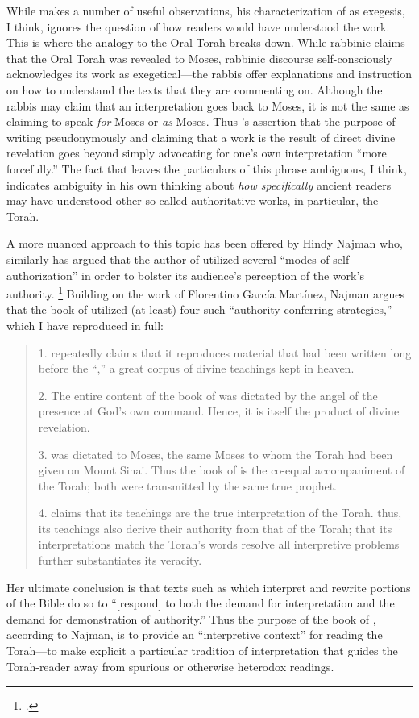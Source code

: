 While \vanderkam makes a number of useful observations, his characterization of \jub as exegesis, I think, ignores the question of how readers would have understood the work. This is where the analogy to the Oral Torah breaks down. While rabbinic claims that the Oral Torah was revealed to Moses, rabbinic discourse self-consciously acknowledges its work as exegetical---the rabbis offer explanations and instruction on how to understand the texts that they are commenting on. Although the rabbis may claim that an interpretation goes back to Moses, it is not the same as claiming to speak \emph{for} Moses or \emph{as} Moses. Thus \vanderkam's assertion that the purpose of writing pseudonymously and claiming that a work is the result of direct divine revelation goes beyond simply advocating for one's own interpretation ``more forcefully.'' The fact that \vanderkam leaves the particulars of this phrase ambiguous, I think, indicates ambiguity in his own thinking about \emph{how specifically} ancient readers may have understood \jub \visavis other so-called authoritative works, in particular, the Torah.

A more nuanced approach to this topic has been offered by Hindy Najman who, similarly has argued that the author of \jub utilized several ``modes of self-authorization'' in order to bolster its audience's perception of the work's authority.%
    \footnote{\cite[380]{najman_jsj1999}.}
Building on the work of Florentino García Martínez,\autocite{martinez_najman-tigchelaar2012} Najman argues that the book of \jub utilized (at least) four such ``authority conferring strategies,'' which I have reproduced in full:
    \begin{quote}
        1. \jub repeatedly claims that it reproduces material that had been written long before the ``\heavenlytablets,'' a great corpus of divine teachings kept in heaven.

        2. The entire content of the book of \jub was dictated by the angel of the presence at God's own command. Hence, it is itself the product of divine revelation.

        3. \jub was dictated to Moses, the same Moses to whom the Torah had been given on Mount Sinai. Thus the book of \jub is the co-equal accompaniment of the Torah; both were transmitted by the same true prophet.

        4. \jub claims that its teachings are the true interpretation of the Torah. thus, its teachings also derive their authority from that of the Torah; that its interpretations match the Torah's words resolve all interpretive problems further substantiates its veracity.%
        \autocite[380]{najman_jsj1999}
    \end{quote}
\noindent
Her ultimate conclusion is that texts such as \jub which interpret and rewrite portions of the Bible do so to ``[respond] to both the demand for interpretation and the demand for demonstration of authority.''\autocite[408]{najman_jsj1999} Thus the purpose of the book of \jub, according to Najman, is to provide an ``interpretive context'' for reading the Torah---to make explicit a particular tradition of interpretation that guides the Torah-reader away from spurious or otherwise heterodox readings. 

